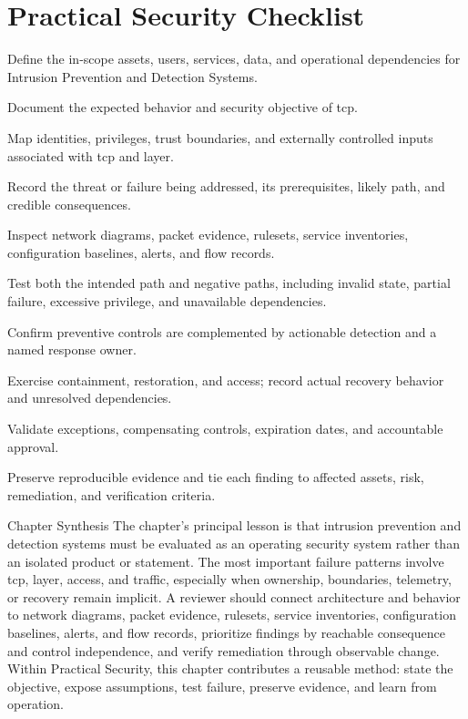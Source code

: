 \documentclass[11pt,letterpaper]{article}
\begin{document}
\section*{Practical Security Checklist}
\begin{CornellChecklist}
\item Define the in-scope assets, users, services, data, and operational dependencies for Intrusion Prevention and Detection Systems.
\item Document the expected behavior and security objective of tcp.
\item Map identities, privileges, trust boundaries, and externally controlled inputs associated with tcp and layer.
\item Record the threat or failure being addressed, its prerequisites, likely path, and credible consequences.
\item Inspect network diagrams, packet evidence, rulesets, service inventories, configuration baselines, alerts, and flow records.
\item Test both the intended path and negative paths, including invalid state, partial failure, excessive privilege, and unavailable dependencies.
\item Confirm preventive controls are complemented by actionable detection and a named response owner.
\item Exercise containment, restoration, and access; record actual recovery behavior and unresolved dependencies.
\item Validate exceptions, compensating controls, expiration dates, and accountable approval.
\item Preserve reproducible evidence and tie each finding to affected assets, risk, remediation, and verification criteria.
\end{CornellChecklist}
\begin{CornellSummaryBox}{Chapter Synthesis}
The chapter's principal lesson is that intrusion prevention and detection systems must be evaluated as an operating security system rather than an isolated product or statement. The most important failure patterns involve tcp, layer, access, and traffic, especially when ownership, boundaries, telemetry, or recovery remain implicit. A reviewer should connect architecture and behavior to network diagrams, packet evidence, rulesets, service inventories, configuration baselines, alerts, and flow records, prioritize findings by reachable consequence and control independence, and verify remediation through observable change. Within Practical Security, this chapter contributes a reusable method: state the objective, expose assumptions, test failure, preserve evidence, and learn from operation.
\end{CornellSummaryBox}
\end{document}
